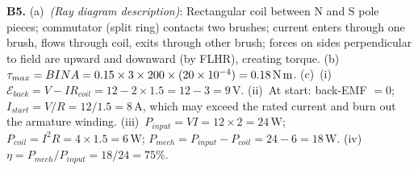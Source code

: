 \textbf{B5.}
(a)~\textit{(Ray diagram description)}:
Rectangular coil between N and S pole pieces;
commutator (split ring) contacts two brushes;
current enters through one brush, flows through coil,
exits through other brush; forces on sides perpendicular
to field are upward and downward (by FLHR),
creating torque. \quad
(b)~$\tau_{max}=BINA=0.15\times3\times200
\times(20\times10^{-4})=0.18\,\text{N\,m}$.
\quad
(c)~(i)~$\mathcal{E}_{back}=V-IR_{coil}
=12-2\times1.5=12-3=9\,\text{V}$.
(ii)~At start: back-EMF $=0$; $I_{start}=V/R
=12/1.5=8\,\text{A}$, which may exceed the rated
current and burn out the armature winding.
(iii)~$P_{input}=VI=12\times2=24\,\text{W}$;
$P_{coil}=I^2R=4\times1.5=6\,\text{W}$;
$P_{mech}=P_{input}-P_{coil}=24-6=18\,\text{W}$.
(iv)~$\eta=P_{mech}/P_{input}=18/24=75\%$.

\endgroup


